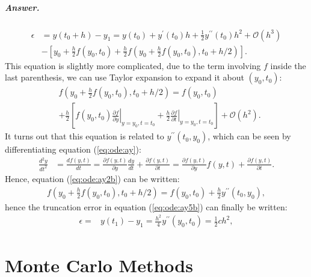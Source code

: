 \documentclass[graybox,sectrefs,envcountresetchap,open=right,final]{svmonodo}
\newenvironment{doconceexercise}{}{}
\begin{document}
\begin{doconceexercise}
\paragraph{Answer.}
\begin{align}
\epsilon&=y(t_0+h)-y_{1}=y(t_0)+y^{\prime}(t_0)h+\frac{1}{2}y^{\prime\prime}(t_0)h^2+\mathcal{O}(h^3)\nonumber\\ 
&-\left[y_{0}+\frac{h}{2}f(y_0,t_0)+\frac{h}{2}f(y_0+\frac{h}{2}f(y_0,t_0),t_0+h/2)\right].\label{eq:ode:ay5b}
\end{align}
This equation is slightly more complicated, due to the term involving $f$ inside the last parenthesis, we can use Taylor expansion to expand it about $(y_0,t_0)$:
\begin{align}
&f(y_0+\frac{h}{2}f(y_0,t_0),t_0+h/2)=f(y_0,t_0)\nonumber\\ 
&+\frac{h}{2}\left[f(y_0,t_0)\left.\frac{\partial f}{\partial y}\right|_{y=y_0,t=t_0}
+\frac{h}{2}\left.\frac{\partial f}{\partial t}\right|_{y=y_0,t=t_0}\right]+\mathcal{O}(h^2).\label{eq:ode:ay2b}
\end{align}
It turns out that this equation is related to $y^{\prime\prime}(t_0,y_0)$, which can be seen by differentiating equation (\ref{eq:ode:ay}):
\begin{align}
\frac{d^2y}{dt^2}&=\frac{df(y,t)}{dt}=\frac{\partial f(y,t)}{\partial y}\frac{dy}{dt}+\frac{\partial f(y,t)}{\partial t}
=\frac{\partial f(y,t)}{\partial y}f(y,t)+\frac{\partial f(y,t)}{\partial t}.\label{eq:ode:ay3b}
\end{align}
Hence, equation (\ref{eq:ode:ay2b}) can be written:
\begin{align}
f(y_0+\frac{h}{2}f(y_0,t_0),t_0+h/2)=f(y_0,t_0)+\frac{h}{2}y^{\prime\prime}(t_0,y_0),\label{eq:ode:ay4b}
\end{align}
hence the truncation error in equation (\ref{eq:ode:ay5b}) can finally be written:
\begin{align}
\epsilon=&y(t_1)-y_{1}=\frac{h^2}{4} y^{\prime\prime}(y_0,t_0)=\frac{1}{2}ch^2,\label{eq:ode:ae4b}
\end{align}


\end{doconceexercise}

\chapter{Monte Carlo Methods}
\label{ch:mc}
\end{document}
